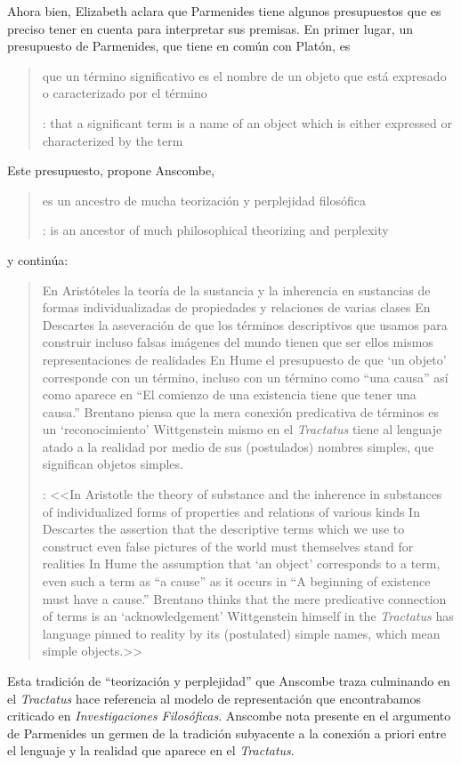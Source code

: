   Ahora bien, Elizabeth aclara que Parmenides tiene algunos presupuestos que es preciso tener en cuenta para interpretar sus premisas. En primer lugar, un presupuesto de Parmenides, que tiene en común con Platón, es \blockquote[{\cite[x]{anscombe1981parmenides}}: that a significant term is a name of an object which is either expressed or characterized by the term]{que un término significativo es el nombre de un objeto que está expresado o caracterizado por el término}. Este presupuesto, propone Anscombe, \blockquote[{\cite[xi]{anscombe1981parmenides}}: is an ancestor of much philosophical theorizing and perplexity]{es un ancestro de mucha teorización y perplejidad filosófica} y continúa: \blockquote[{\cite[xi]{anscombe1981parmenides}}: <<In Aristotle \textelp{} the theory of substance and the inherence in substances of individualized forms of properties and relations of various kinds \textelp{} In Descartes \textelp{} the assertion that the descriptive terms which we use to construct even false pictures of the world must themselves stand for realities \textelp{} In Hume \textelp{} the assumption that `an object' corresponds to a term, even such a term as ``a cause'' as it occurs in ``A beginning of existence must have a cause.'' \textelp{} Brentano thinks that the mere predicative connection of terms is an `acknowledgement' \textelp{} Wittgenstein himself in the \emph{Tractatus} has language pinned to reality by its (postulated) simple names, which mean simple objects.>>]{En Aristóteles \textelp{} la teoría de la sustancia y la inherencia en sustancias de formas individualizadas de propiedades y relaciones de varias clases \textelp{} En Descartes \textelp{} la aseveración de que los términos descriptivos que usamos para construir incluso falsas imágenes del mundo tienen que ser ellos mismos representaciones de realidades \textelp{} En Hume \textelp{} el presupuesto de que `un objeto' corresponde con un término, incluso con un término como ``una causa'' así como aparece en ``El comienzo de una existencia tiene que tener una causa.'' \textelp{} Brentano piensa que la mera conexión predicativa de términos es un `reconocimiento' \textelp{} Wittgenstein mismo en el \emph{Tractatus} tiene al lenguaje atado a la realidad por medio de sus (postulados) nombres simples, que significan objetos simples.} Esta tradición de \enquote{teorización y perplejidad} que Anscombe traza culminando en el \emph{Tractatus} hace referencia al modelo de representación que encontrabamos criticado en \emph{Investigaciones Filosóficas}. Anscombe nota presente en el argumento de Parmenides un germen de la tradición subyacente a la conexión a priori entre el lenguaje y la realidad que aparece en el \emph{Tractatus}.

